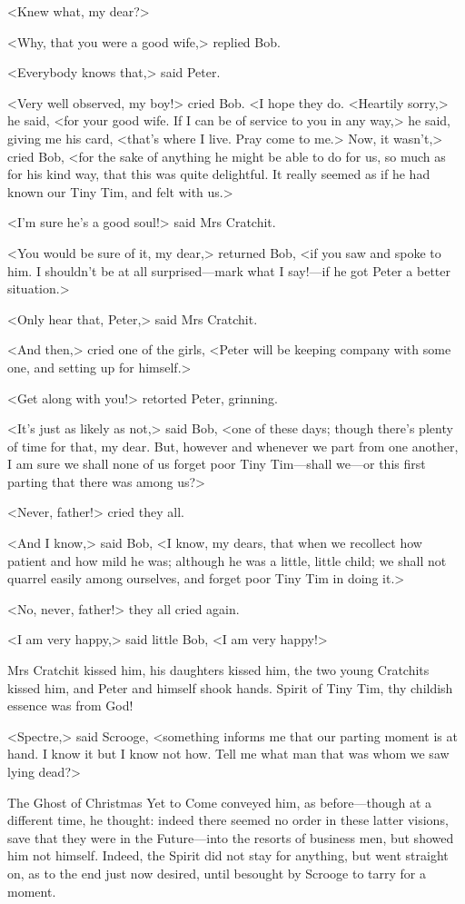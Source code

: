 <Knew what, my dear?>

<Why, that you were a good wife,> replied Bob.

<Everybody knows that,> said Peter.

<Very well observed, my boy!> cried Bob. <I hope they do. <Heartily sorry,> he
said, <for your good wife. If I can be of service to you in any way,> he said,
giving me his card, <that's where I live. Pray come to me.> Now, it wasn't,>
cried Bob, <for the sake of anything he might be able to do for us, so much as
for his kind way, that this was quite delightful. It really seemed as if he had
known our Tiny Tim, and felt with us.>

<I'm sure he's a good soul!> said Mrs Cratchit.

<You would be sure of it, my dear,> returned Bob, <if you saw and spoke to him.
I shouldn't be at all surprised—mark what I say!—if he got Peter a better
situation.>

<Only hear that, Peter,> said Mrs Cratchit.

<And then,> cried one of the girls, <Peter will be keeping company with some
one, and setting up for himself.>

<Get along with you!> retorted Peter, grinning.

<It's just as likely as not,> said Bob, <one of these days; though there's
plenty of time for that, my dear. But, however and when\-ever we part from one
another, I am sure we shall none of us forget poor Tiny Tim—shall we—or this
first parting that there was among us?>

<Never, father!> cried they all.

<And I know,> said Bob, <I know, my dears, that when we recollect how patient
and how mild he was; although he was a little, little child; we shall not
quarrel easily among ourselves, and forget poor Tiny Tim in doing it.>

<No, never, father!> they all cried again.

<I am very happy,> said little Bob, <I am very happy!>

Mrs Cratchit kissed him, his daughters kissed him, the two young Cratchits
kissed him, and Peter and himself shook hands. Spirit of Tiny Tim, thy childish
essence was from God!

<Spectre,> said Scrooge, <something informs me that our parting moment is at
hand. I know it but I know not how. Tell me what man that was whom we saw lying
dead?>

The Ghost of Christmas Yet to Come conveyed him, as before—though at a different
time, he thought: indeed there seemed no order in these latter visions, save
that they were in the Future—into the resorts of business men, but showed him
not himself. Indeed, the Spirit did not stay for anything, but went straight on,
as to the end just now desired, until besought by Scrooge to tarry for a moment.

